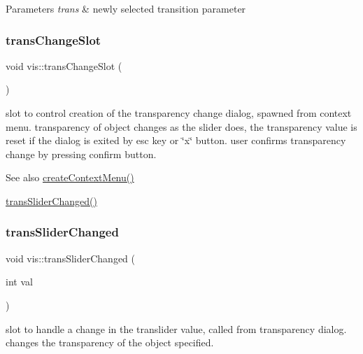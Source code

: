 \begin{DoxyParams}{Parameters}
{\em trans} & newly selected transition parameter \\
\hline
\end{DoxyParams}
\mbox{\label{classvis_af2c43f4aaebe6ee5047e8eb9e9e8eedd}} 
\subsubsection{\texorpdfstring{trans\+Change\+Slot}{transChangeSlot}}
{\footnotesize\ttfamily void vis\+::trans\+Change\+Slot (\begin{DoxyParamCaption}{ }\end{DoxyParamCaption})\hspace{0.3cm}{\ttfamily [slot]}}

slot to control creation of the transparency change dialog, spawned from context menu. transparency of object changes as the slider does, the transparency value is reset if the dialog is exited by esc key or \char`\"{}x\char`\"{} button. user confirms transparency change by pressing confirm button.

\begin{DoxySeeAlso}{See also}
\mbox{\hyperlink{classvis_a63af66f730f0f06f36d255bcc7a7a244}{create\+Context\+Menu()}} 

\mbox{\hyperlink{classvis_aa7568cc4804a9f945f54a4933ced67d0}{trans\+Slider\+Changed()}} 
\end{DoxySeeAlso}
\mbox{\label{classvis_aa7568cc4804a9f945f54a4933ced67d0}} 
\subsubsection{\texorpdfstring{trans\+Slider\+Changed}{transSliderChanged}}
{\footnotesize\ttfamily void vis\+::trans\+Slider\+Changed (\begin{DoxyParamCaption}\item[{int}]{val }\end{DoxyParamCaption})\hspace{0.3cm}{\ttfamily [slot]}}

slot to handle a change in the translider value, called from transparency dialog. changes the transparency of the object specified.

